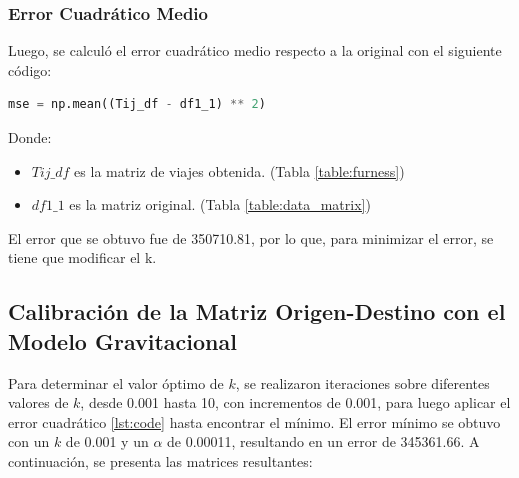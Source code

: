 \documentclass[letterpaper,12pt]{article}
\begin{document}
\subsubsection{Error Cuadrático Medio}
Luego, se calculó el error cuadrático medio respecto a la original con el siguiente código:


\begin{lstlisting}[language=Python, label={lst:code}]
    mse = np.mean((Tij_df - df1_1) ** 2)
\end{lstlisting}

Donde:
\begin{itemize}
    \item $Tij\_df$ es la matriz de viajes obtenida. (Tabla \ref{table:furness})
    \item $df1\_1$ es la matriz original. (Tabla \ref{table:data_matrix})
\end{itemize}

El error que se obtuvo fue de 350710.81, por lo que, para minimizar el error, se tiene que modificar el k.

\subsection{Calibración de la Matriz Origen-Destino con el Modelo Gravitacional}
Para determinar el valor óptimo de \( k \), se realizaron iteraciones sobre diferentes valores de \( k \), desde 0.001 hasta 10, con incrementos de 0.001, para luego aplicar el error cuadrático \ref{lst:code} hasta encontrar el mínimo. El error mínimo se obtuvo con un \( k \) de 0.001 y un \( \alpha \) de 0.00011, resultando en un error de 345361.66. A continuación, se presenta las matrices resultantes:
\end{document}
